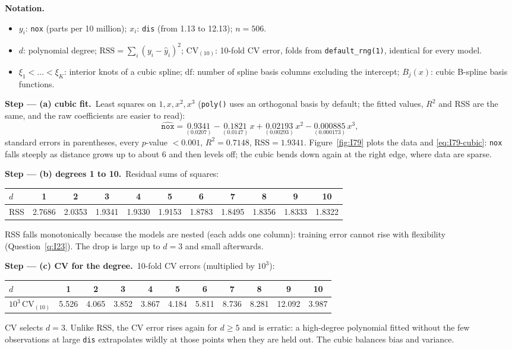 \documentclass[11pt,a4paper]{article}
\numberwithin{equation}{questao}   %
\newenvironment{notacao}{\par\smallskip\noindent\textbf{Notation.}\begin{itemize}[leftmargin=1.4em,topsep=1pt,itemsep=0pt]\small}{\end{itemize}}
\newcommand{\passo}[2]{\par\smallskip\noindent\textbf{Step --- #1.}~#2}
\begin{document}
\begin{sol}
\begin{notacao}
\item $y_i$: \texttt{nox} (parts per 10 million); $x_i$: \texttt{dis} (from 1.13 to 12.13); $n=506$.
\item $d$: polynomial degree; $\mathrm{RSS}=\sum_i(y_i-\hat y_i)^2$; $\mathrm{CV}_{(10)}$: 10-fold
  CV error, folds from \texttt{default\_rng(1)}, identical for every model.
\item $\xi_1<\dots<\xi_K$: interior knots of a cubic spline; $\mathrm{df}$: number of spline basis
  columns excluding the intercept; $B_j(x)$: cubic B-spline basis functions.
\end{notacao}

\passo{(a) cubic fit}{Least squares on $1,x,x^2,x^3$ (\texttt{poly()} uses an orthogonal basis by
default; the fitted values, $R^2$ and RSS are the same, and the raw coefficients are easier to
read):
\begin{equation}\label{eq:I79-cubic}
\widehat{\texttt{nox}}=\underset{(0.0207)}{0.9341}-\underset{(0.0147)}{0.1821}\,x+\underset{(0.00293)}{0.02193}\,x^2-\underset{(0.000173)}{0.000885}\,x^3,
\end{equation}
standard errors in parentheses, every $p$-value $<0.001$, $R^2=0.7148$, $\mathrm{RSS}=1.9341$.
Figure~\ref{fig:I79} plots the data and \eqref{eq:I79-cubic}: \texttt{nox} falls steeply as
distance grows up to about 6 and then levels off; the cubic bends down again at the right edge,
where data are sparse.}

\passo{(b) degrees 1 to 10}{Residual sums of squares:
\begin{center}\small\setlength{\tabcolsep}{3.5pt}\begin{tabular}{lcccccccccc}\toprule
$d$ & 1 & 2 & 3 & 4 & 5 & 6 & 7 & 8 & 9 & 10\\\midrule
RSS & 2.7686 & 2.0353 & 1.9341 & 1.9330 & 1.9153 & 1.8783 & 1.8495 & 1.8356 & 1.8333 & 1.8322\\\bottomrule\end{tabular}\end{center}
RSS falls monotonically because the models are nested (each adds one column): training error
cannot rise with flexibility (Question~\ref{q:I23}). The drop is large up to $d=3$ and small afterwards.}

\passo{(c) CV for the degree}{10-fold CV errors (multiplied by $10^3$):
\begin{center}\small\setlength{\tabcolsep}{3.5pt}\begin{tabular}{lcccccccccc}\toprule
$d$ & 1 & 2 & 3 & 4 & 5 & 6 & 7 & 8 & 9 & 10\\\midrule
$10^3\,\mathrm{CV}_{(10)}$ & 5.526 & 4.065 & 3.852 & 3.867 & 4.184 & 5.811 & 8.736 & 8.281 & 12.092 & 3.987\\\bottomrule\end{tabular}\end{center}
CV selects $d=3$. Unlike RSS, the CV error rises again for $d\ge5$ and is erratic: a high-degree
polynomial fitted without the few observations at large \texttt{dis} extrapolates wildly at
those points when they are held out. The cubic balances bias and variance.}


\end{sol}
\end{document}
